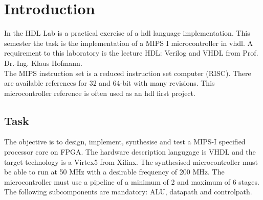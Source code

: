 \chapter{Introduction}
In the HDL Lab is a practical exercise of a hdl language implementation. This semester the task is the implementation of a MIPS I microcontroller in vhdl. 
A requirement to this laboratory is the lecture HDL: Verilog and VHDL from Prof. Dr.-Ing. Klaus Hofmann.\\
The MIPS instruction set is a reduced instruction set computer (RISC). There are available references for 32 and 64-bit with many revisions. This microcontroller reference is often used as an
hdl first project.\\

\section{Task}

The objective is to design, implement, synthesise and test a MIPS-I specified processor core on FPGA. The hardware description langugage is VHDL and the target technology is a Virtex5 from Xilinx.
The synthesised microcontroller must be able to run at 50 MHz with a desirable frequency of 200 MHz. The microcontroller must use a pipeline of a minimum of 2 and maximum of 6 stages.
The following subcomponents are mandatory: ALU, datapath and controlpath.
